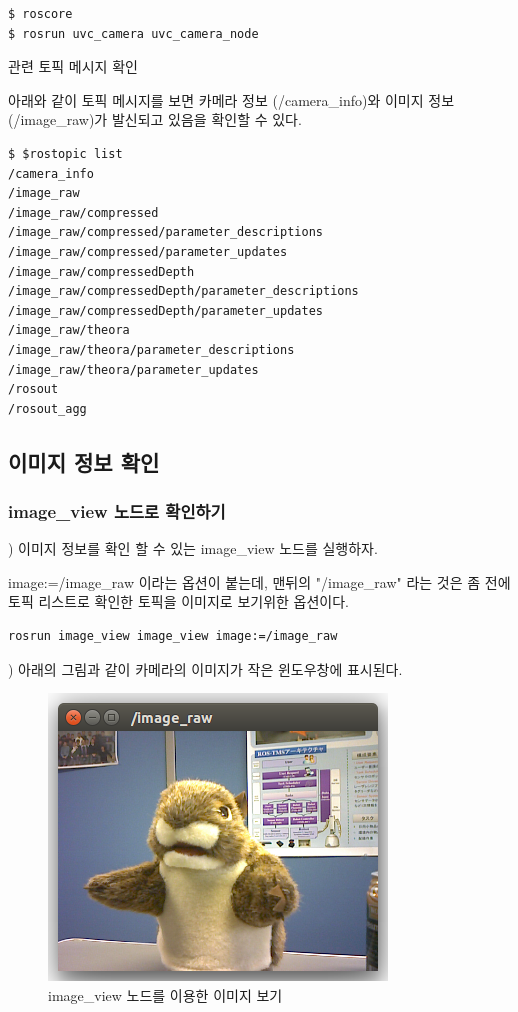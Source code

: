 \begin{lstlisting}[language=ROS]
$ roscore
$ rosrun uvc_camera uvc_camera_node
\end{lstlisting}

\circled{\thenum} 관련 토픽 메시지 확인

아래와 같이 토픽 메시지를 보면 카메라 정보 (/camera\_info)와 이미지 정보 (/image\_raw)가 발신되고 있음을 확인할 수 있다.

\begin{lstlisting}[language=ROS]
$ $rostopic list
/camera_info
/image_raw
/image_raw/compressed
/image_raw/compressed/parameter_descriptions
/image_raw/compressed/parameter_updates
/image_raw/compressedDepth
/image_raw/compressedDepth/parameter_descriptions
/image_raw/compressedDepth/parameter_updates
/image_raw/theora
/image_raw/theora/parameter_descriptions
/image_raw/theora/parameter_updates
/rosout
/rosout_agg
\end{lstlisting}

\subsection{이미지 정보 확인}

\subsubsection{image\_view 노드로 확인하기}

\setcounter{num}{0}

\noindent
{}\thenum) 이미지 정보를 확인 할 수 있는 image\_view 노드를 실행하자.

\noindent
image:=/image\_raw 이라는 옵션이 붙는데, 맨뒤의 "/image\_raw" 라는 것은 좀 전에 토픽 리스트로 확인한 토픽을 이미지로 보기위한 옵션이다.

\begin{lstlisting}[language=ROS]
rosrun image_view image_view image:=/image_raw
\end{lstlisting}

\noindent
{}\thenum) 아래의 그림과 같이 카메라의 이미지가 작은 윈도우창에 표시된다.

\begin{figure}[h]
\centering\includegraphics[width=0.5\columnwidth]{pictures/chapter9/imageview.png}
\caption{image\_view 노드를 이용한 이미지 보기}
\end{figure}

